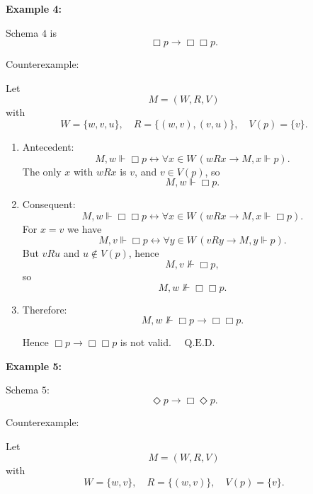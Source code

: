 \documentclass[12pt,a4paper,openany]{article}
\begin{document}
\textbf{Example 4:}

Schema $4$ is
$$\Box p \to \Box\Box p.$$

Counterexample:

Let
$$M=(W,R,V)$$
with
$$W=\{w,v,u\},\quad R=\{(w,v),(v,u)\},\quad V(p)=\{v\}.$$

\begin{enumerate}
    \item Antecedent:
    $$M,w\Vdash\Box p
    \leftrightarrow \forall x\in W\,(wRx\to M,x\Vdash p).$$
    The only $x$ with $wRx$ is $v$, and $v\in V(p)$, so
    $$M,w\Vdash\Box p.$$
    
    \item Consequent:
    $$M,w\Vdash\Box\Box p
    \leftrightarrow \forall x\in W\,(wRx\to M,x\Vdash\Box p).$$
    For $x=v$ we have
    $$M,v\Vdash\Box p
    \leftrightarrow \forall y\in W\,(vRy\to M,y\Vdash p).$$
    But $vRu$ and $u\notin V(p)$, hence
    $$M,v\not\Vdash\Box p,$$
    so
    $$M,w\not\Vdash\Box\Box p.$$
    
    \item Therefore:
    $$M,w\not\Vdash \Box p \to \Box\Box p.$$
    
    Hence $\Box p \to \Box\Box p$ is not valid. $\quad \text{Q.E.D.}$
\end{enumerate}

\begin{center}
\end{center}

\textbf{Example 5:}

Schema $5$:
$$\Diamond p \to \Box\Diamond p.$$

Counterexample:

Let
$$M=(W,R,V)$$
with
$$W=\{w,v\},\quad R=\{(w,v)\},\quad V(p)=\{v\}.$$
\end{document}
